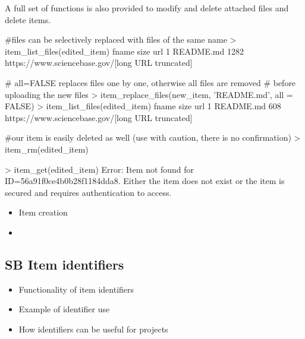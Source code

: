 A full set of functions is also provided to modify and delete attached 
files and delete items. 

\begin{example}
#files can be selectively replaced with files of the same name
> item_list_files(edited_item)
      fname size     url
1 README.md 1282     https://www.sciencebase.gov/[long URL truncated]

# all=FALSE replaces files one by one, otherwise all files are removed
# before uploading the new files
> item_replace_files(new_item, 'README.md', all = FALSE)
> item_list_files(edited_item)
      fname size     url
1 README.md 608     https://www.sciencebase.gov/[long URL truncated]

#our item is easily deleted as well (use with caution, there is no confirmation)
> item_rm(edited_item)

> item_get(edited_item)
Error: Item not found for ID=56a91f0ce4b0b28f1184dda8. Either the item does 
not exist or the item is secured and requires authentication to access.
\end{example}


\begin{itemize}
	\item{Item creation}
	\item{}
\end{itemize}

\subsection{SB Item identifiers}
\begin{itemize}
	\item{Functionality of item identifiers}
	\item{Example of identifier use}
	\item{How identifiers can be useful for projects}
\end{itemize}
